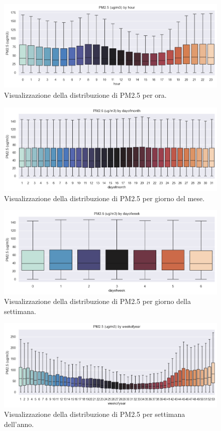 \documentclass[a4paper,12pt]{report}
\begin{document}
	\begin{figure}[H]
		\centering
		\includegraphics[width=1.0\textwidth]{img/byhour_pm.png}
		\caption{Visualizzazione della distribuzione di PM2.5 per ora.}
	\end{figure}
	\begin{figure}[H]
		\centering
		\includegraphics[width=1.0\textwidth]{img/bydayofmonth_pm.png}
		\caption{Visualizzazione della distribuzione di PM2.5 per giorno del mese.}
	\end{figure}
	\begin{figure}[H]
		\centering
		\includegraphics[width=1.0\textwidth]{img/bydayofweek_pm.png}
		\caption{Visualizzazione della distribuzione di PM2.5 per giorno della settimana.}
	\end{figure}
	\begin{figure}[H]
		\centering
		\includegraphics[width=1.0\textwidth]{img/byweekofyear_pm.png}
		\caption{Visualizzazione della distribuzione di PM2.5 per settimana dell'anno.}
	\end{figure}
\end{document}
